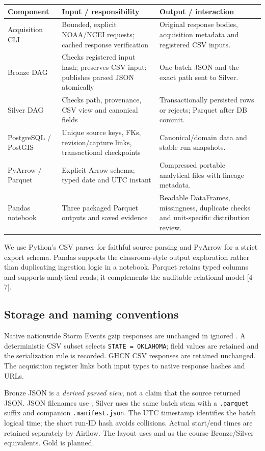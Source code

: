 \documentclass[10pt]{article}
\begin{document}
\begin{tabularx}{\textwidth}{@{}L{3.2cm}YY@{}}
\toprule
Component & Input / responsibility & Output / interaction\\
\midrule
Acquisition CLI & Bounded, explicit NOAA/NCEI requests; cached response verification &
Original response bodies, acquisition metadata and registered CSV inputs.\\
Bronze DAG & Checks registered input hash; preserves CSV input; publishes parsed JSON atomically &
One batch JSON and the exact path sent to Silver.\\
Silver DAG & Checks path, provenance, CSV view and canonical fields &
Transactionally persisted rows or rejects; Parquet after DB commit.\\
PostgreSQL / PostGIS & Unique source keys, FKs, revision/capture links, transactional checkpoints &
Canonical/domain data and stable run snapshots.\\
PyArrow / Parquet & Explicit Arrow schema; typed date and UTC instant &
Compressed portable analytical files with lineage metadata.\\
Pandas notebook & Three packaged Parquet outputs and saved evidence &
Readable DataFrames, missingness, duplicate checks and unit-specific distribution review.\\
\bottomrule
\end{tabularx}

We use Python's CSV parser for faithful source parsing and PyArrow for a strict
export schema. Pandas supports the classroom-style output exploration rather
than duplicating ingestion logic in a notebook. Parquet retains typed columns
and supports analytical reads; it complements the auditable relational model
[4--7].

\subsection{Storage and naming conventions}
Native nationwide Storm Events gzip responses are unchanged in ignored
. A deterministic CSV subset selects
\texttt{STATE = OKLAHOMA}; field values are retained and the serialization rule is
recorded. GHCN CSV responses are retained unchanged. The acquisition register
links both input types to native response hashes and URLs.

Bronze JSON is a \emph{derived parsed view}, not a claim that the source returned
JSON. JSON filenames use
; Silver uses the same batch stem
with a \texttt{.parquet} suffix and companion \texttt{.manifest.json}.
The UTC timestamp identifies the batch logical time; the short run-ID hash
avoids collisions. Actual start/end times are retained separately by Airflow.
The layout uses  and  as the course
Bronze/Silver equivalents. Gold is planned.
\end{document}
